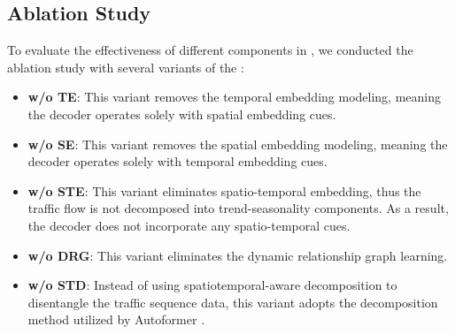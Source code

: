 \subsection{Ablation Study}


To evaluate the effectiveness of different components in \model, we conducted the ablation study with several variants of the \model:
\begin{itemize}
    \item \textbf{w/o TE}: This variant removes the temporal embedding modeling, meaning the decoder operates solely with spatial embedding cues.
    \item \textbf{w/o SE}: This variant removes the spatial embedding modeling, meaning the decoder operates solely with temporal embedding cues.
    \item \textbf{w/o STE}: This variant eliminates spatio-temporal embedding, thus the traffic flow is not decomposed into trend-seasonality components. As a result, the decoder does not incorporate any spatio-temporal cues.
    \item \textbf{w/o DRG}: This variant eliminates the dynamic relationship graph learning.
    \item \textbf{w/o STD}: Instead of using spatiotemporal-aware decomposition to disentangle the traffic sequence data, this variant adopts the decomposition method utilized by Autoformer \cite{wu2021Autoformer}.
\end{itemize}

